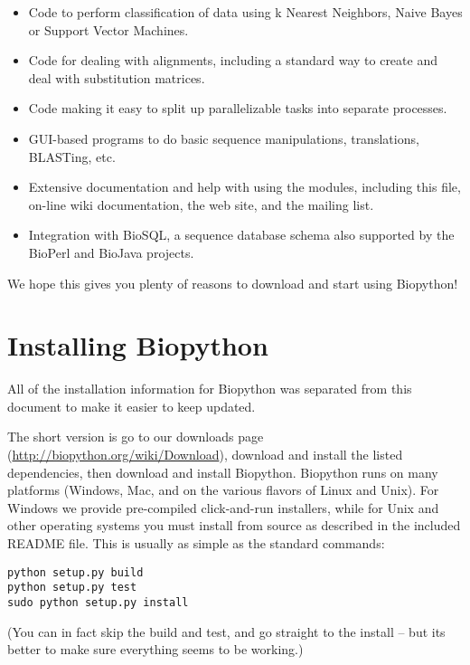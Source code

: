 \begin{itemize}
  \item Code to perform classification of data using k Nearest Neighbors, Naive Bayes or Support Vector Machines.

  \item Code for dealing with alignments, including a standard way to create and deal with substitution matrices.

  \item Code making it easy to split up parallelizable tasks into separate processes.

  \item GUI-based programs to do basic sequence manipulations, translations, BLASTing, etc.

  \item Extensive documentation and help with using the modules, including this file, on-line wiki documentation, the web site, and the mailing list.

  \item Integration with BioSQL, a sequence database schema also supported by the BioPerl and BioJava projects.

\end{itemize}

We hope this gives you plenty of reasons to download and start using Biopython!

\section{Installing Biopython}

All of the installation information for Biopython was separated from
this document to make it easier to keep updated.

The short version is go to our downloads page (\url{http://biopython.org/wiki/Download}),
download and install the listed dependencies, then download and install Biopython.
Biopython runs on many platforms (Windows, Mac, and on the various flavors of Linux and Unix).
For Windows we provide pre-compiled click-and-run installers, while for Unix and other
operating systems you must install from source as described in the included README file.
This is usually as simple as the standard commands:

\begin{verbatim}
python setup.py build
python setup.py test
sudo python setup.py install
\end{verbatim}

\noindent (You can in fact skip the build and test, and go straight to the install --
but its better to make sure everything seems to be working.)

